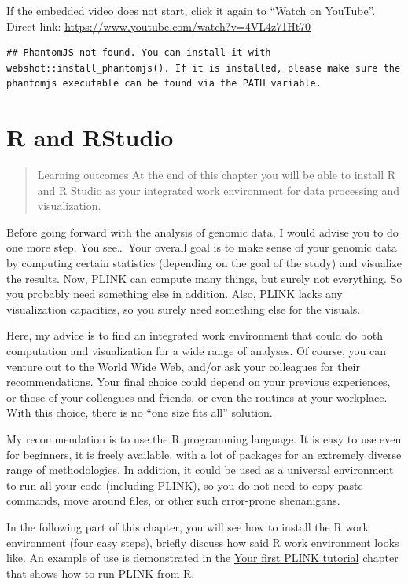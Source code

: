 \documentclass[]{book}
\begin{document}
If the embedded video does not start, click it again to ``Watch on
YouTube''. Direct link:
\url{https://www.youtube.com/watch?v=4VL4z71Ht70}

\begin{verbatim}
## PhantomJS not found. You can install it with webshot::install_phantomjs(). If it is installed, please make sure the phantomjs executable can be found via the PATH variable.
\end{verbatim}

\hypertarget{r-and-rstudio}{\chapter{R and
RStudio}\label{r-and-rstudio}}

\begin{quote}
Learning outcomes At the end of this chapter you will be able to install
R and R Studio as your integrated work environment for data processing
and visualization.
\end{quote}

Before going forward with the analysis of genomic data, I would advise
you to do one more step. You see\ldots{} Your overall goal is to make
sense of your genomic data by computing certain statistics (depending on
the goal of the study) and visualize the results. Now, PLINK can compute
many things, but surely not everything. So you probably need something
else in addition. Also, PLINK lacks any visualization capacities, so you
surely need something else for the visuals.

Here, my advice is to find an integrated work environment that could do
both computation and visualization for a wide range of analyses. Of
course, you can venture out to the World Wide Web, and/or ask your
colleagues for their recommendations. Your final choice could depend on
your previous experiences, or those of your colleagues and friends, or
even the routines at your workplace. With this choice, there is no ``one
size fits all'' solution.

My recommendation is to use the R programming language. It is easy to
use even for beginners, it is freely available, with a lot of packages
for an extremely diverse range of methodologies. In addition, it could
be used as a universal environment to run all your code (including
PLINK), so you do not need to copy-paste commands, move around files, or
other such error-prone shenanigans.

In the following part of this chapter, you will see how to install the R
work environment (four easy steps), briefly discuss how said R work
environment looks like. An example of use is demonstrated in the
\protect\hyperlink{your-first-plink-tutorial}{Your first PLINK tutorial}
chapter that shows how to run PLINK from R.
\end{document}
